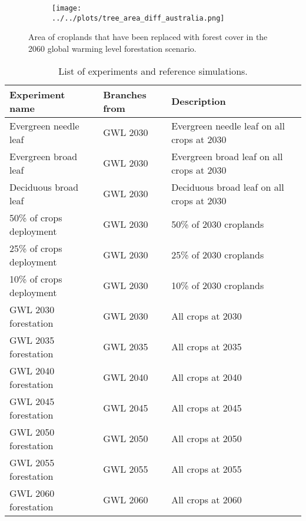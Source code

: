 \documentclass[]{article}
\begin{document}
\begin{figure}[H]
    \begin{subfigure}[b]{\linewidth}
        \centering
        \texttt{[image: ../../plots/tree\_area\_diff\_australia.png]}
    \end{subfigure}
    \caption{Area of croplands that have been replaced with forest cover in the 2060 global warming level forestation scenario.}
    \label{fig:to_forest}
\end{figure}

\begin{table}[]
    \caption{List of experiments and reference simulations.}
    \label{tab:experiments}
    \begin{tabular}{lll}
\hline
Experiment name            & Branches from & Description                                \\ \hline
Evergreen needle leaf      & GWL 2030      & Evergreen needle leaf on all crops at 2030 \\
Evergreen broad leaf       & GWL 2030      & Evergreen broad leaf on all crops at 2030  \\
Deciduous broad leaf       & GWL 2030      & Deciduous broad leaf on all crops at 2030  \\
50\% of crops deployment   & GWL 2030      & 50\% of 2030 croplands                     \\
25\% of crops deployment   & GWL 2030      & 25\% of 2030 croplands                     \\
10\% of crops deployment   & GWL 2030      & 10\% of 2030 croplands                     \\
GWL 2030 forestation       & GWL 2030      & All crops at 2030                          \\
GWL 2035 forestation       & GWL 2035      & All crops at 2035                          \\
GWL 2040 forestation       & GWL 2040      & All crops at 2040                          \\
GWL 2045 forestation       & GWL 2045      & All crops at 2045                          \\
GWL 2050 forestation       & GWL 2050      & All crops at 2050                          \\
GWL 2055 forestation       & GWL 2055      & All crops at 2055                          \\
GWL 2060 forestation       & GWL 2060      & All crops at 2060                          \\
\end{tabular}
\end{table}
\end{document}
